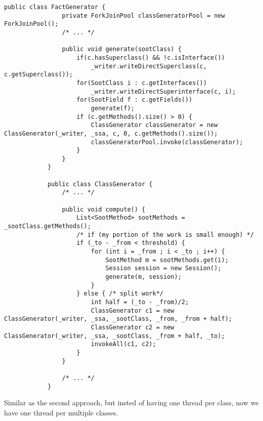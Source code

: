 \documentclass{dithesis}
\begin{document}
        \begin{lstlisting}[frame=single]
            public class FactGenerator {
                private ForkJoinPool classGeneratorPool = new ForkJoinPool();
                /* ... */

                public void generate(sootClass) {
                    if(c.hasSuperclass() && !c.isInterface())
                        _writer.writeDirectSuperclass(c, c.getSuperclass());
                    for(SootClass i : c.getInterfaces())
                        _writer.writeDirectSuperinterface(c, i);
                    for(SootField f : c.getFields())
                        generate(f);
                    if (c.getMethods().size() > 0) {
                        ClassGenerator classGenerator = new ClassGenerator(_writer, _ssa, c, 0, c.getMethods().size());
                        classGeneratorPool.invoke(classGenerator);
                    }
                }
            }

            public class ClassGenerator {
                /* ... */

                public void compute() {
                    List<SootMethod> sootMethods = _sootClass.getMethods();
                    /* if (my portion of the work is small enough) */
                    if (_to - _from < threshold) {
                        for (int i = _from ; i < _to ; i++) {
                            SootMethod m = sootMethods.get(i);
                            Session session = new Session();
                            generate(m, session);
                        }
                    } else { /* split work*/
                        int half = (_to - _from)/2;
                        ClassGenerator c1 = new ClassGenerator(_writer, _ssa, _sootClass, _from, _from + half);
                        ClassGenerator c2 = new ClassGenerator(_writer, _ssa, _sootClass, _from + half, _to);
                        invokeAll(c1, c2);
                    }
                }

                /* ... */
            }
        \end{lstlisting}


        Similar as the second approach, but insted of having one thread per class, now we have one thread per multiple classes.
\end{document}
